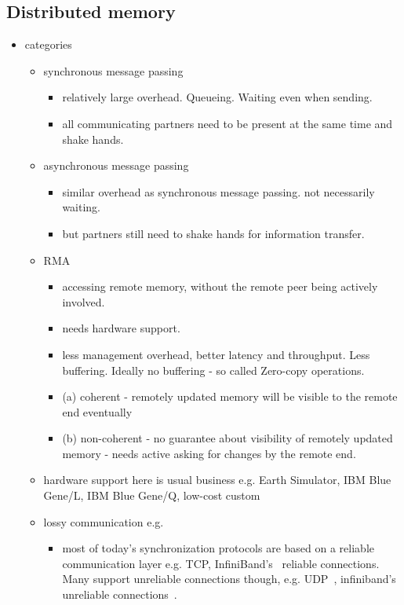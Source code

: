 \documentclass[a4paper, 10pt]{article}
\begin{document}
\subsection{Distributed memory}
\begin{itemize}
	\item categories
		\begin{itemize}
			\item synchronous message passing
				\begin{itemize}
					\item relatively large overhead. Queueing. Waiting even when sending.
					\item all communicating partners need to be present at the same time and shake hands.
				\end{itemize}
			\item asynchronous message passing
				\begin{itemize}
					\item similar overhead as synchronous message passing. not necessarily waiting.
					\item but partners still need to shake hands for information transfer.
				\end{itemize}
			\item RMA
				\begin{itemize}
					\item accessing remote memory, without the remote peer being actively involved.
					\item needs hardware support.
					\item less management overhead, better latency and throughput. Less buffering. Ideally no buffering - so called Zero-copy operations.
					\item (a) coherent - remotely updated memory will be visible to the remote end eventually
					\item (b) non-coherent - no guarantee about visibility of remotely updated memory - needs active asking for changes by the remote end.
				\end{itemize}
			\item hardware support here is usual business e.g. Earth Simulator\cite{earthsimulator}, IBM Blue Gene/L\cite{bluegenel}, IBM Blue Gene/Q\cite{bluegeneq}, low-cost custom\cite{hoefler2006b}
			\item lossy communication e.g.
				\begin{itemize}
					\item most of today's synchronization protocols are based on a reliable communication layer e.g. TCP, InfiniBand's~\cite{infiniband} reliable connections. Many support unreliable connections though, e.g. UDP~\cite{udp}, infiniband's unreliable connections~.

\end{itemize}
\end{itemize}
\end{itemize}
\end{document}
